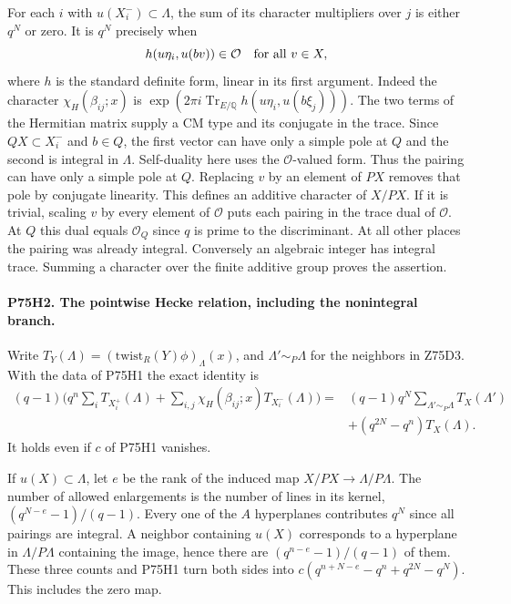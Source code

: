 For each $i$ with $u(X_i^-)\subset\Lambda$, the sum of its
character multipliers over $j$ is either $q^N$ or zero. It is $q^N$
precisely when
\[
                 h(u\eta_i,u(bv))\in\mathcal O
                     \quad\hbox{for all }v\in X ,
\]
where $h$ is the standard definite form, linear in its first argument.
Indeed the character $\chi_H(\beta_{ij};x)$ is
$\exp(2\pi i\operatorname{Tr}_{E/\mathbb Q} h(u\eta_i,u(b\xi_j)))$.
The two terms of the Hermitian matrix supply a CM type and its
conjugate in the trace. Since $QX\subset X_i^-$ and $b\in Q$,
the first vector can have only a simple pole at $Q$ and the second
is integral in $\Lambda$. Self-duality here uses the
$\mathcal O$-valued form. Thus the pairing can have only a simple
pole at $Q$. Replacing $v$ by an element of $PX$ removes that pole
by conjugate linearity. This defines an additive character of $X/PX$.
If it is trivial, scaling $v$ by every element of $\mathcal O$
puts each pairing in the trace dual of $\mathcal O$. At $Q$ this
dual equals $\mathcal O_Q$ since $q$ is prime to the discriminant.
At all other places the pairing was already integral. Conversely
an algebraic integer has integral trace. Summing a character over
the finite additive group proves the assertion.

\paragraph{P75H2. The pointwise Hecke relation, including the nonintegral branch.}
Write $T_Y(\Lambda)= (\mathrm{twist}_R(Y)\phi)_\Lambda(x)$, and
$\Lambda'\sim_P\Lambda$ for the neighbors in Z75D3. With the data
of P75H1 the exact identity is
\[
\begin{split}
 (q-1)\bigg(q^n\sum_i T_{X_i^+}(\Lambda)
       +\sum_{i,j}\chi_H(\beta_{ij};x)T_{X_i^-}(\Lambda)\bigg)
    ={}&(q-1)q^N\sum_{\Lambda'\sim_P\Lambda}T_X(\Lambda')\\
       &+(q^{2N}-q^n)T_X(\Lambda).
\end{split}
\]
It holds even if $c$ of P75H1 vanishes.

If $u(X)\subset\Lambda$, let $e$ be the rank of the induced map
$X/PX\to\Lambda/P\Lambda$. The number of allowed enlargements
is the number of lines in its kernel,
$(q^{N-e}-1)/(q-1)$. Every one of the $A$ hyperplanes contributes
$q^N$ since all pairings are integral. A neighbor containing $u(X)$
corresponds to a hyperplane in $\Lambda/P\Lambda$ containing the
image, hence there are $(q^{n-e}-1)/(q-1)$ of them. These three
counts and P75H1 turn both sides into
$c(q^{n+N-e}-q^n+q^{2N}-q^N)$. This includes the zero map.

